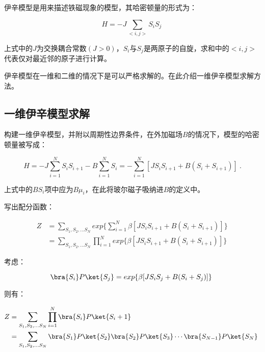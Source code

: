 
\begin{issues}
\issueDraft
\issueMissDepend
{}
\end{issues}



伊辛模型是用来描述铁磁现象的模型，其哈密顿量的形式为：

\begin{equation}
H=-J\sum\limits_{<i,j>}S_iS_j~
\end{equation}

上式中的$J$为交换耦合常数$(J>0)$，$S_i$与$S_j$是两原子的自旋，求和中的$<i,j>$代表仅对最近邻的原子进行计算。

伊辛模型在一维和二维的情况下是可以严格求解的。在此介绍一维伊辛模型求解方法。

\subsection{一维伊辛模型求解}

构建一维伊辛模型，并附以周期性边界条件，在外加磁场$B$的情况下，模型的哈密顿量被写成：

\begin{equation}
H=-J\sum\limits_{i=1}^NS_iS_{i+1}-B\sum\limits_{i=1}^NS_i=-\sum\limits_{i=1}^N[JS_iS_{i+1}+B(S_i+S_{i+1})]~.
\end{equation}

上式中的$BS_i$项中应为$B\mu_i$，在此将玻尔磁子吸纳进$B$的定义中。

写出配分函数：

\begin{align}
Z&=\sum\limits_{S_1,S_2,...S_N}exp\{\sum\limits_{i=1}^N\beta[JS_iS_{i+1}+B(S_i+S_{i+1})]\} \\
&=\sum\limits_{S_1,S_2,...S_N}\prod\limits_{i=1}^N exp\{\beta[JS_iS_{i+1}+B(S_i+S_{i+1})]\}~
\end{align}

考虑：

\begin{equation}
\bra{S_i}P\ket{S_j}=exp\{\beta[JS_iS_{j}+B(S_i+S_{j})]\}~
\end{equation}

则有：

\begin{align}
Z&=\sum\limits_{S_1,S_2,...S_N}\prod\limits_{i=1}^N\bra{S_i}P\ket{S_i+1} \\
&=\sum\limits_{S_1,S_2,...S_N}\bra{S_1}P\ket{S_2} \bra{S_2}P\ket{S_3}\cdots\bra{S_{N-1}}P\ket{S_N} ~
\end{align}

